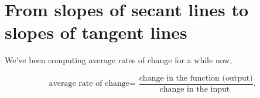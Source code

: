 \documentclass{ximera}
\begin{document}
\section{From slopes of secant lines to slopes of tangent lines}

We've been computing average rates of change for a while now, 

\[
{\text{average rate of change=
    }}
\frac{\text{change in the function (output)}}{\text{change in the input 
   }}.
\]
\begin{comment}
 how exactly does one find the function that will give the
instantaneous rate of change? Recall that the instantaneous rate of change
of a line is the slope of the line.  Hence the instantaneous rate of
change of a function is the slope of the tangent line. For now,
consider the following informal definition of a \textit{tangent line}:
\begin{quote}\index{tangent line}
Given a function $f$ and a number $a$ in the domain of $f$, if one can ``zoom in''
on the graph at $(a, f(a))$ sufficiently so that it appears to be a straight line,
then that line is the \dfn{tangent line} to $f(x)$ at the point $(a,f(a))$.
\end{quote}
We illustrate this informal definition with the following diagram:
\begin{image}
\begin{tikzpicture}
  \begin{axis}[
            domain=0:6, range=0:7,
            ymin=-.2,ymax=7,
            width=6in,
            height=2.5in, %
            axis lines=none,
          ]   
          \addplot [draw=none, fill=textColor!10!background] plot coordinates {(.8,1.6) (2.834,5)} \closedcycle; %
          \addplot [draw=none, fill=textColor!10!background] plot coordinates {(2.834,5) (4.166,5)} \closedcycle; %
          \addplot [draw=none, fill=background] plot coordinates {(1.2,1.6) (4.166,5)} \closedcycle; %
          \addplot [draw=none, fill=background] plot coordinates {(.8,1.6) (1.2,1.6)} \closedcycle; %

          \addplot [draw=none, fill=textColor!10!background] plot coordinates {(3.3,3.6) (5.334,5)} \closedcycle; %
          \addplot [draw=none, fill=textColor!10!background] plot coordinates {(5.334,5) (6.666,5)} \closedcycle; %
          \addplot [draw=none, fill=background] plot coordinates {(3.7,3.6) (6.666,5)} \closedcycle; %
          \addplot [draw=none, fill=background] plot coordinates {(3.3,3.6) (3.7,3.6)} \closedcycle; %
          

\end{comment}
\end{document}
